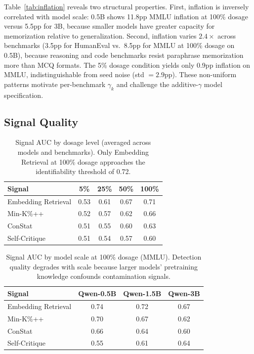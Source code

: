 \documentclass[letterpaper,11pt]{article}
\begin{document}
Table~\ref{tab:inflation} reveals two structural properties.
First, inflation is inversely correlated with model scale: 0.5B shows 11.8pp MMLU inflation at 100\% dosage versus 5.5pp for 3B, because smaller models have greater capacity for memorization relative to generalization.
Second, inflation varies $2.4\times$ across benchmarks (3.5pp for HumanEval vs.\ 8.5pp for MMLU at 100\% dosage on 0.5B), because reasoning and code benchmarks resist paraphrase memorization more than MCQ formats.
The 5\% dosage condition yields only 0.9pp inflation on MMLU, indistinguishable from seed noise (std $= 2.9$pp).
These non-uniform patterns motivate per-benchmark $\gamma_k$ and challenge the additive-$\gamma$ model specification.

\subsection{Signal Quality}
\label{sec:signals}

\begin{table}[t]
\centering
\caption{Signal AUC by dosage level (averaged across models and benchmarks). Only Embedding Retrieval at 100\% dosage approaches the identifiability threshold of 0.72.}
\label{tab:signal_auc_dosage}
\begin{tabular}{@{}lcccc@{}}
\toprule
Signal & 5\% & 25\% & 50\% & 100\% \\
\midrule
Embedding Retrieval & 0.53 & 0.61 & 0.67 & 0.71 \\
Min-K\%++ & 0.52 & 0.57 & 0.62 & 0.66 \\
ConStat & 0.51 & 0.55 & 0.60 & 0.63 \\
Self-Critique & 0.51 & 0.54 & 0.57 & 0.60 \\
\bottomrule
\end{tabular}
\end{table}

\begin{table}[t]
\centering
\caption{Signal AUC by model scale at 100\% dosage (MMLU). Detection quality degrades with scale because larger models' pretraining knowledge confounds contamination signals.}
\label{tab:signal_auc_scale}
\begin{tabular}{@{}lccc@{}}
\toprule
Signal & Qwen-0.5B & Qwen-1.5B & Qwen-3B \\
\midrule
Embedding Retrieval & 0.74 & 0.72 & 0.67 \\
Min-K\%++ & 0.70 & 0.67 & 0.62 \\
ConStat & 0.66 & 0.64 & 0.60 \\
Self-Critique & 0.55 & 0.61 & 0.64 \\
\bottomrule
\end{tabular}
\end{table}
\end{document}
